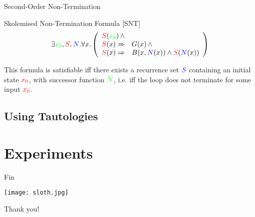 \documentclass[xcolor=pdftex,t,11pt]{beamer}
\newcommand{\red}[1]{\textcolor{red}{#1}}
\newcommand{\blue}[1]{\textcolor{blue}{#1}}
\newcommand{\green}[1]{\textcolor{green}{#1}}
\begin{document}
\begin{frame}{Second-Order Non-Termination}

\begin{block}{Skolemised Non-Termination Formula [SNT]}
 \[
 \exists \green{x_0}, \red{S}, \blue{N} . \forall x . \left ( \begin{array}{rl}
   \red{S}(\green{x_0}) \, \wedge & \\
   \red{S}(x) \Rightarrow & G(x) \, \wedge \\
   \red{S}(x) \Rightarrow & B(x, \blue{N}(x)) \wedge \red{S}(\blue{N}(x)) 
   \end{array} \right )
 \]
 \end{block}

 \vspace{1em}

This formula is satisfiable iff there exists a recurrence set $\blue{S}$ containing
an initial state $\red{x_0}$, with successor function $\green{N}$, i.e. iff the loop
does not terminate for some input $\red{x_0}$.
\end{frame}



\subsection{Using Tautologies}

\section{Experiments}

\begin{frame}[fragile]{Fin}

\begin{center}
\texttt{[image: sloth.jpg]}

\Huge
 Thank you!
\end{center}

\end{frame}
\end{document}
